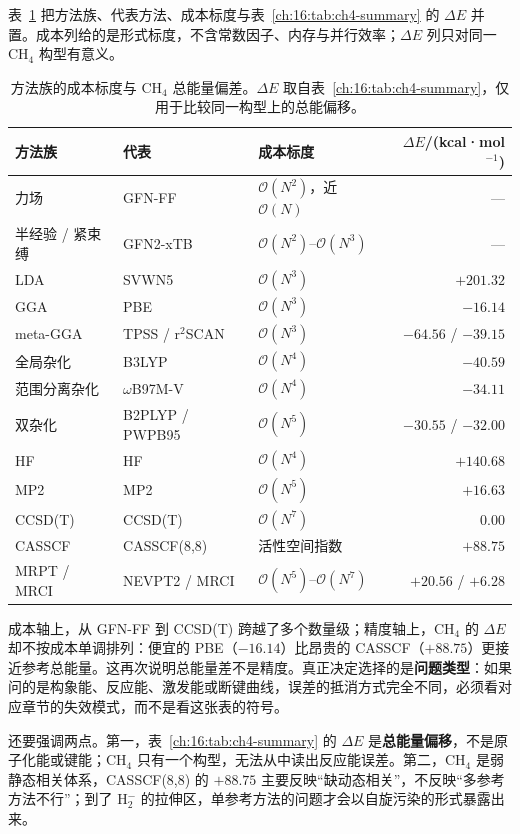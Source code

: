 表~\ref{ch:16:tab:cost} 把方法族、代表方法、成本标度与表~\ref{ch:16:tab:ch4-summary} 的 $\Delta E$ 并置。成本列给的是形式标度，不含常数因子、内存与并行效率；$\Delta E$ 列只对同一 CH$_4$ 构型有意义。

{\small
\begin{table}[t]
\centering
\caption{方法族的成本标度与 CH$_4$ 总能量偏差。$\Delta E$ 取自表~\ref{ch:16:tab:ch4-summary}，仅用于比较同一构型上的总能偏移。}
\label{ch:16:tab:cost}
\begin{tabular}{@{}l l l r@{}}
\toprule
方法族 & 代表 & 成本标度 & $\Delta E$/(kcal·mol$^{-1}$) \\
\midrule
力场 & GFN-FF & $\mathcal{O}(N^2)$，近 $\mathcal{O}(N)$ & — \\
半经验 / 紧束缚 & GFN2-xTB & $\mathcal{O}(N^2)$–$\mathcal{O}(N^3)$ & — \\
LDA & SVWN5 & $\mathcal{O}(N^3)$ & $+201.32$ \\
GGA & PBE & $\mathcal{O}(N^3)$ & $-16.14$ \\
meta-GGA & TPSS / r$^2$SCAN & $\mathcal{O}(N^3)$ & $-64.56$ / $-39.15$ \\
全局杂化 & B3LYP & $\mathcal{O}(N^4)$ & $-40.59$ \\
范围分离杂化 & $\omega$B97M-V & $\mathcal{O}(N^4)$ & $-34.11$ \\
双杂化 & B2PLYP / PWPB95 & $\mathcal{O}(N^5)$ & $-30.55$ / $-32.00$ \\
HF & HF & $\mathcal{O}(N^4)$ & $+140.68$ \\
MP2 & MP2 & $\mathcal{O}(N^5)$ & $+16.63$ \\
CCSD(T) & CCSD(T) & $\mathcal{O}(N^7)$ & $0.00$ \\
CASSCF & CASSCF(8,8) & 活性空间指数 & $+88.75$ \\
MRPT / MRCI & NEVPT2 / MRCI & $\mathcal{O}(N^5)$–$\mathcal{O}(N^7)$ & $+20.56$ / $+6.28$ \\
\bottomrule
\end{tabular}
\end{table}
}

成本轴上，从 GFN-FF 到 CCSD(T) 跨越了多个数量级；精度轴上，CH$_4$ 的 $\Delta E$ 却不按成本单调排列：便宜的 PBE（$-16.14$）比昂贵的 CASSCF（$+88.75$）更接近参考总能量。这再次说明总能量差不是精度。真正决定选择的是\textbf{问题类型}：如果问的是构象能、反应能、激发能或断键曲线，误差的抵消方式完全不同，必须看对应章节的失效模式，而不是看这张表的符号。

还要强调两点。第一，表~\ref{ch:16:tab:ch4-summary} 的 $\Delta E$ 是\textbf{总能量偏移}，不是原子化能或键能；CH$_4$ 只有一个构型，无法从中读出反应能误差。第二，CH$_4$ 是弱静态相关体系，CASSCF(8,8) 的 $+88.75$ 主要反映“缺动态相关”，不反映“多参考方法不行”；到了 H$_2^-$ 的拉伸区，单参考方法的问题才会以自旋污染的形式暴露出来。

